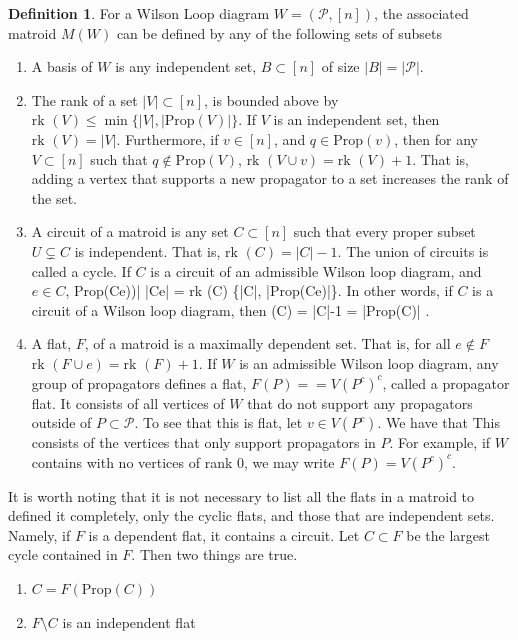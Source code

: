 \documentclass[11pt]{article}
\newcommand{\rk}{\textrm{rk }}
\def\bas #1\eas{\begin{align*} #1 \end{align*}}
\newcommand{\cP}{\mathcal{P}}
\newcommand{\Prop}{\textrm{Prop}}
\theoremstyle{remark}
\theoremstyle{definition}
\newtheorem{dfn}[thm]{Definition}
\begin{document}
\begin{dfn} For a Wilson Loop diagram $W = (\cP, [n])$, the associated matroid $M(W)$ can be defined by any of the following sets of subsets
\begin{enumerate}
\item A basis of $W$ is any independent set, $B \subset [n]$ of size $|B| = |\cP|$.
\item The rank of a set $|V| \subset [n]$, is bounded above by $\rk(V) \leq \min\{ |V| , |\Prop(V)|\}$. If $V$ is an independent set, then $\rk(V) = |V|$. Furthermore, if $v \in [n]$, and $q \in \Prop(v)$, then for any $V \subset [n]$ such that $q \not \in \Prop(V)$, $\rk(V \cup v) = \rk(V) +1$. That is, adding a vertex that supports a new propagator to a set increases the rank of the set.
\item A circuit of a matroid is any set $C \subset [n]$ such that every proper subset $U \subsetneq C$ is independent. That is, $\rk(C) = |C|-1$. The union of circuits is called a cycle. If $C$ is a circuit of an admissible Wilson loop diagram, and $e \in C$, \bas |\Prop(C\setminus e))| \leq |C\setminus e| = \rk(C) \leq \min\{|C|, |\Prop(C\setminus e)|\}\;.\eas
    In other words, if $C$ is a circuit of a Wilson loop diagram, then \bas \rk(C) = |C|-1 = |\Prop(C)| \;. \eas
\item A flat, $F$, of a matroid is a maximally dependent set. That is, for all $e \not \in F$ $\rk(F \cup e) = \rk(F) +1$. If $W$ is an admissible Wilson loop diagram, any group of propagators defines a flat, $F(P) = = V(P^c)^c$, called a propagator flat. It consists of all vertices of $W$ that do not support any propagators outside of $P \subset \cP$. To see that this is flat, let $v \in V(P^c)$. We have that  This consists of the vertices that only support propagators in $P$. For example, if $W$ contains with no vertices of rank $0$, we may write $F(P) = V(P^c)^c$.
\end{enumerate}
\end{dfn}

It is worth noting that it is not necessary to list all the flats in a matroid to defined it completely, only the cyclic flats, and those that are independent sets. Namely, if $F$ is a dependent flat, it contains a circuit. Let $C \subset F$ be the largest cycle contained in $F$. Then two things are true. \begin{enumerate}
\item $C = F(\Prop (C))$
\item $F \setminus C$ is an independent flat
\end{enumerate}
\end{document}
